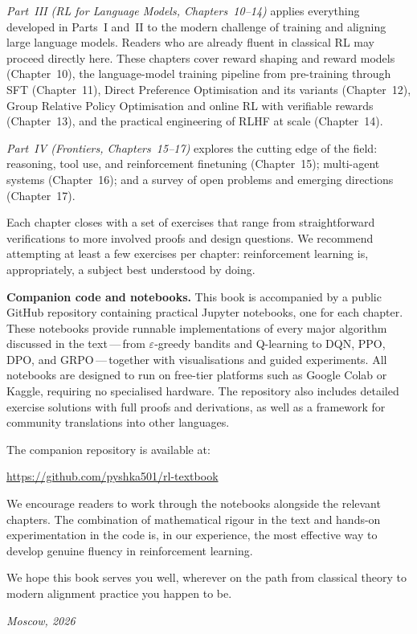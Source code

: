 \emph{Part~III (RL for Language Models, Chapters~10--14)} applies everything developed in
Parts~I and~II to the modern challenge of training and aligning large language models.
Readers who are already fluent in classical RL may proceed directly here.  These chapters
cover reward shaping and reward models (Chapter~10), the language-model training pipeline
from pre-training through SFT (Chapter~11), Direct Preference Optimisation and its
variants (Chapter~12), Group Relative Policy Optimisation and online RL with verifiable
rewards (Chapter~13), and the practical engineering of RLHF at scale (Chapter~14).

\emph{Part~IV (Frontiers, Chapters~15--17)} explores the cutting edge of the field:
reasoning, tool use, and reinforcement finetuning (Chapter~15); multi-agent systems
(Chapter~16); and a survey of open problems and emerging directions (Chapter~17).

Each chapter closes with a set of exercises that range from straightforward verifications to
more involved proofs and design questions.  We recommend attempting at least a few exercises
per chapter: reinforcement learning is, appropriately, a subject best understood by doing.

\medskip

\textbf{Companion code and notebooks.}\quad
This book is accompanied by a public GitHub repository containing practical Jupyter
notebooks, one for each chapter.  These notebooks provide runnable implementations of
every major algorithm discussed in the text\,---\,from $\varepsilon$-greedy bandits and
Q-learning to DQN, PPO, DPO, and GRPO\,---\,together with visualisations and guided
experiments.  All notebooks are designed to run on free-tier platforms such as Google
Colab or Kaggle, requiring no specialised hardware.  The repository also includes
detailed exercise solutions with full proofs and derivations, as well as a framework
for community translations into other languages.

The companion repository is available at:

\medskip
\centerline{\url{https://github.com/pyshka501/rl-textbook}}
\medskip

\noindent
We encourage readers to work through the notebooks alongside the relevant chapters.
The combination of mathematical rigour in the text and hands-on experimentation in
the code is, in our experience, the most effective way to develop genuine fluency in
reinforcement learning.

\medskip

We hope this book serves you well, wherever on the path from classical theory to modern
alignment practice you happen to be.

\bigskip

\hfill\textit{Moscow, 2026}
